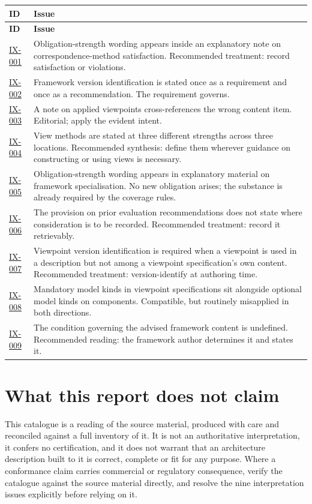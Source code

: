 \documentclass[11pt,a4paper]{report}
\newcommand{\rref}[1]{\hyperref[rule:#1]{\textsf{\small #1}}}
\begin{document}
\begin{center}
\small
\begin{longtable}{@{}L{16mm} L{120mm}@{}}
\toprule
\textbf{ID} & \textbf{Issue} \\
\midrule
\endfirsthead
\toprule
\textbf{ID} & \textbf{Issue} \\
\midrule
\endhead
\bottomrule
\endfoot
\rref{IX-001} & Obligation-strength wording appears inside an explanatory note on
  correspondence-method satisfaction. Recommended treatment: record satisfaction
  or violations. \\
\rref{IX-002} & Framework version identification is stated once as a requirement
  and once as a recommendation. The requirement governs. \\
\rref{IX-003} & A note on applied viewpoints cross-references the wrong content
  item. Editorial; apply the evident intent. \\
\rref{IX-004} & View methods are stated at three different strengths across three
  locations. Recommended synthesis: define them wherever guidance on constructing
  or using views is necessary. \\
\rref{IX-005} & Obligation-strength wording appears in explanatory material on
  framework specialisation. No new obligation arises; the substance is already
  required by the coverage rules. \\
\rref{IX-006} & The provision on prior evaluation recommendations does not state
  where consideration is to be recorded. Recommended treatment: record it
  retrievably. \\
\rref{IX-007} & Viewpoint version identification is required when a viewpoint is
  used in a description but not among a viewpoint specification's own content.
  Recommended treatment: version-identify at authoring time. \\
\rref{IX-008} & Mandatory model kinds in viewpoint specifications sit alongside
  optional model kinds on components. Compatible, but routinely misapplied in
  both directions. \\
\rref{IX-009} & The condition governing the advised framework content is
  undefined. Recommended reading: the framework author determines it and states
  it. \\
\bottomrule
\end{longtable}
\end{center}

\section{What this report does not claim}

This catalogue is a reading of the source material, produced with care and
reconciled against a full inventory of it. It is not an authoritative
interpretation, it confers no certification, and it does not warrant that an
architecture description built to it is correct, complete or fit for any
purpose. Where a conformance claim carries commercial or regulatory
consequence, verify the catalogue against the source material directly, and
resolve the nine interpretation issues explicitly before relying on it.
\end{document}
